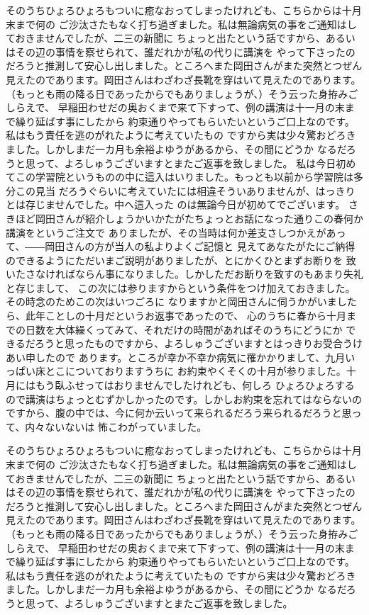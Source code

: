   そのうちひょろひょろもついに癒なおってしまったけれども、こちらからは十月末まで何の
  ご沙汰さたもなく打ち過ぎました。私は無論病気の事をご通知はしておきませんでしたが、二三の新聞に
  ちょっと出たという話ですから、あるいはその辺の事情を察せられて、誰だれかが私の代りに講演を
  やって下さったのだろうと推測して安心し出しました。ところへまた岡田さんがまた突然とつぜん
  見えたのであります。岡田さんはわざわざ長靴を穿はいて見えたのであります。
  （もっとも雨の降る日であったからでもありましょうが、）そう云った身拵みごしらえで、
  早稲田わせだの奥おくまで来て下すって、例の講演は十一月の末まで繰り延ばす事にしたから
  約束通りやってもらいたいというご口上なのです。私はもう責任を逃のがれたように考えていたもの
  ですから実は少々驚おどろきました。しかしまだ一カ月も余裕よゆうがあるから、その間にどうか
  なるだろうと思って、よろしゅうございますとまたご返事を致しました。
  私は今日初めてこの学習院というものの中に這入はいりました。もっとも以前から学習院は多分この見当
  だろうぐらいに考えていたには相違そういありませんが、はっきりとは存じませんでした。中へ這入った
  のは無論今日が初めてでございます。
  さきほど岡田さんが紹介しょうかいかたがたちょっとお話になった通りこの春何か講演をというご注文で
  ありましたが、その当時は何か差支さしつかえがあって、――岡田さんの方が当人の私よりよくご記憶と
  見えてあなたがたにご納得のできるようにただいまご説明がありましたが、とにかくひとまずお断りを
  致いたさなければならん事になりました。しかしただお断りを致すのもあまり失礼と存じまして、
  この次には参りますからという条件をつけ加えておきました。その時念のためこの次はいつごろに
  なりますかと岡田さんに伺うかがいましたら、此年ことしの十月だというお返事であったので、
  心のうちに春から十月までの日数を大体繰くってみて、それだけの時間があればそのうちにどうにか
  できるだろうと思ったものですから、よろしゅうございますとはっきりお受合うけあい申したので
  あります。ところが幸か不幸か病気に罹かかりまして、九月いっぱい床とこについておりますうちに
  お約束やくそくの十月が参りました。十月にはもう臥ふせってはおりませんでしたけれども、何しろ
  ひょろひょろするので講演はちょっとむずかしかったのです。しかしお約束を忘れてはならないの
  ですから、腹の中では、今に何か云いって来られるだろう来られるだろうと思って、内々ないないは
  怖こわがっていました。

  そのうちひょろひょろもついに癒なおってしまったけれども、こちらからは十月末まで何の
  ご沙汰さたもなく打ち過ぎました。私は無論病気の事をご通知はしておきませんでしたが、二三の新聞に
  ちょっと出たという話ですから、あるいはその辺の事情を察せられて、誰だれかが私の代りに講演を
  やって下さったのだろうと推測して安心し出しました。ところへまた岡田さんがまた突然とつぜん
  見えたのであります。岡田さんはわざわざ長靴を穿はいて見えたのであります。
  （もっとも雨の降る日であったからでもありましょうが、）そう云った身拵みごしらえで、
  早稲田わせだの奥おくまで来て下すって、例の講演は十一月の末まで繰り延ばす事にしたから
  約束通りやってもらいたいというご口上なのです。私はもう責任を逃のがれたように考えていたもの
  ですから実は少々驚おどろきました。しかしまだ一カ月も余裕よゆうがあるから、その間にどうか
  なるだろうと思って、よろしゅうございますとまたご返事を致しました。



